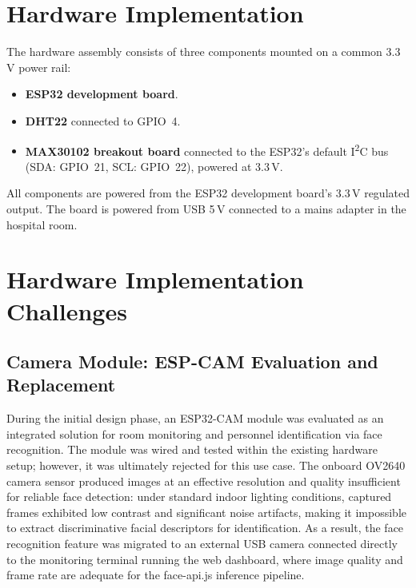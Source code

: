 \section{Hardware Implementation}

The hardware assembly consists of three components mounted on a common 3.3\,V power
rail:

\begin{itemize}
	\item \textbf{ESP32 development board}\cite{esp32_datasheet}.
	\item \textbf{DHT22}\cite{dht22_datasheet} connected to GPIO~4.
	\item \textbf{MAX30102 breakout board}\cite{max30102_datasheet} connected to the ESP32's default
	      I\textsuperscript{2}C bus (SDA: GPIO~21, SCL: GPIO~22), powered at 3.3\,V.
\end{itemize}

All components are powered from the ESP32 development board's 3.3\,V regulated output.
The board is powered from USB 5\,V connected to a mains adapter in the hospital room.

\section{Hardware Implementation Challenges}

\subsection*{Camera Module: ESP-CAM Evaluation and Replacement}

During the initial design phase, an ESP32-CAM module was evaluated as an integrated solution for room monitoring and personnel identification via face recognition. The module was wired and tested within the existing hardware setup; however, it was ultimately rejected for this use case. The onboard OV2640 camera sensor produced images at an effective resolution and quality insufficient for reliable face detection: under standard indoor lighting conditions, captured frames exhibited low contrast and significant noise artifacts, making it impossible to extract discriminative facial descriptors for identification. As a result, the face recognition feature was migrated to an external USB camera connected directly to the monitoring terminal running the web dashboard, where image quality and frame rate are adequate for the face-api.js inference pipeline.

